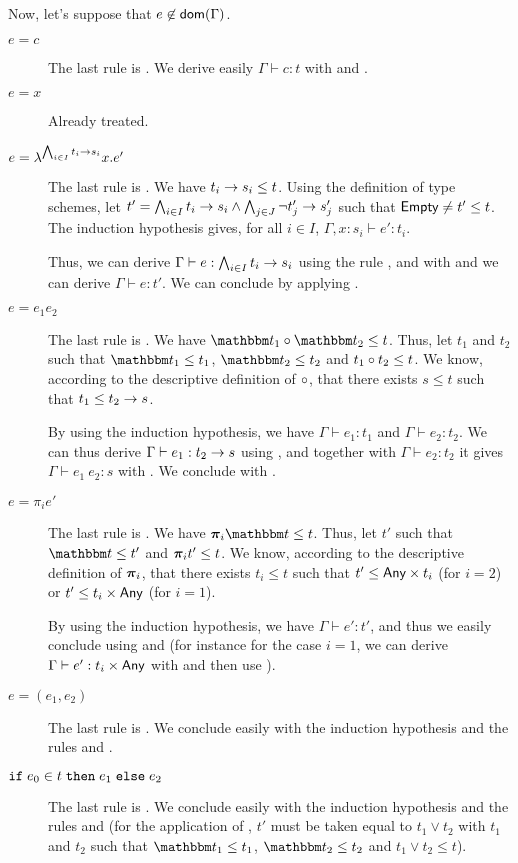 \documentclass[a4paper]{article}
\theoremstyle{definition}
\begin{document}
  Now, let's suppose that $e\not\in\textsf{dom}(\Gamma)$.

  \begin{description}
    \item[$e=c$] The last rule is . We derive easily $\Gamma \vdash c:t$ with  and .
    \item[$e=x$] Already treated.
    \item[$e=\lambda^{\bigwedge_{i\in I} t_i\to s_i}x.e'$]
    The last rule is .
    We have $t_i\to s_i \leq t$.
    Using the definition of type schemes, let $t'=\bigwedge_{i\in I} t_i\to s_i \land \bigwedge_{j\in J} \neg t'_j\to s'_j$ such that $\textsf{Empty} \neq t' \leq t$.
    The induction hypothesis gives, for all $i\in I$, $\Gamma,x:s_i\vdash e':t_i$.
    
    Thus, we can derive $\Gamma\vdash e:\bigwedge_{i\in I} t_i\to s_i$ using the rule , and with  and
     we can derive $\Gamma\vdash e:t'$. We can conclude by applying .
    \item[$e=e_1 e_2$] The last rule is .
    We have $\apply {\ts_1} {\ts_2} \leq t$. Thus, let $t_1$ and $t_2$ such that $\ts_1 \leq t_1$, $\ts_2 \leq t_2$ and $t_1\circ t_2 \leq t$.
    We know, according to the descriptive definition of $\circ$, that there exists $s\leq t$ such that $t_1 \leq t_2\to s$.

    By using the induction hypothesis, we have $\Gamma\vdash e_1:t_1$ and $\Gamma\vdash e_2:t_2$. We can thus derive
    $\Gamma\vdash e_1:t_2\to s$ using , and together with $\Gamma\vdash e_2:t_2$ it gives
    $\Gamma\vdash e_1\ e_2:s$ with . We conclude with .

    \item[$e=\pi_i e'$] The last rule is . We have $\bpi_i \ts \leq t$. Thus, let $t'$ such that $\ts \leq t'$ and $\boldsymbol{\pi}_i t' \leq t$.
    We know, according to the descriptive definition of $\boldsymbol{\pi}_i$, that there exists $t_i\leq t$ such that $t' \leq \textsf{Any}\times t_i$ (for $i=2$) or $t' \leq t_i\times \textsf{Any}$ (for $i=1$).
    
    By using the induction hypothesis, we have $\Gamma\vdash e':t'$, and thus we easily conclude using  and 
    (for instance for the case $i=1$, we can derive $\Gamma\vdash e':t_i\times \textsf{Any}$ with  and then use ).

    \item[$e=(e_1,e_2)$] The last rule is . We conclude easily with the induction hypothesis and the rules  and .

    \item[$\texttt{if}\;e_0\in t\;\texttt{then}\;e_1\;\texttt{else}\;e_2$] The last rule is . We conclude easily with the induction hypothesis and the rules
     and  (for the application of , $t'$ must be taken equal to $t_1 \vee t_2$ with $t_1$ and $t_2$ such that $\ts_1\leq t_1$, $\ts_2\leq t_2$ and $t_1 \vee t_2 \leq t$).
  \end{description}
\end{document}

